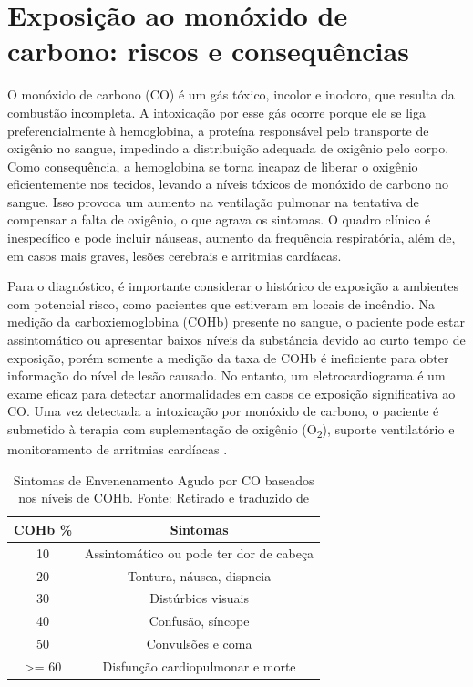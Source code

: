 \section{Exposição ao monóxido de carbono: riscos e consequências}

O monóxido de carbono (CO) é um gás tóxico, incolor e inodoro, que resulta da combustão incompleta. A intoxicação por esse gás ocorre porque ele se liga preferencialmente à hemoglobina, a proteína 
responsável pelo transporte de oxigênio no sangue, impedindo a distribuição adequada de oxigênio pelo corpo. Como consequência, a hemoglobina se 
torna incapaz de liberar o oxigênio eficientemente nos tecidos, levando a níveis tóxicos de monóxido de carbono no sangue. Isso provoca um aumento na ventilação 
pulmonar na tentativa de compensar a falta de oxigênio, o que agrava os sintomas. O quadro clínico é inespecífico e pode incluir náuseas, aumento da 
frequência respiratória, além de, em casos mais graves, lesões cerebrais e arritmias cardíacas.

Para o diagnóstico, é importante considerar o histórico de exposição a ambientes com potencial risco, como pacientes que estiveram em locais de incêndio. Na medição 
da carboxiemoglobina (COHb) presente no sangue, o paciente pode estar assintomático ou apresentar baixos níveis da substância devido ao curto tempo de exposição, porém somente a medição da taxa de COHb é 
ineficiente para obter informação do nível de lesão causado. No entanto, um eletrocardiograma é um exame eficaz para detectar anormalidades em casos de exposição significativa ao CO. Uma vez detectada 
a intoxicação por monóxido de carbono, o paciente é submetido à terapia com suplementação de oxigênio (O\textsubscript{2}), suporte ventilatório e monitoramento de arritmias cardíacas \cite{carbon-monoxide-poisoning-varon}.

\begin{table}[h!]
    \centering
    \begin{tabular}{|c|c|}
        \hline
        \textbf{COHb \%} & \textbf{Sintomas} \\
        \hline
        10 & Assintomático ou pode ter dor de cabeça \\
        \hline
        20 & Tontura, náusea, dispneia \\
        \hline
        30 & Distúrbios visuais \\
        \hline
        40 & Confusão, síncope \\
        \hline
        50 & Convulsões e coma \\
        \hline
        >= 60 & Disfunção cardiopulmonar e morte \\
        \hline
    \end{tabular}
    \caption{Sintomas de Envenenamento Agudo por CO baseados nos níveis de COHb. Fonte: Retirado e traduzido de \cite{carbon-monoxide-poisoning-varon}}
\end{table}

